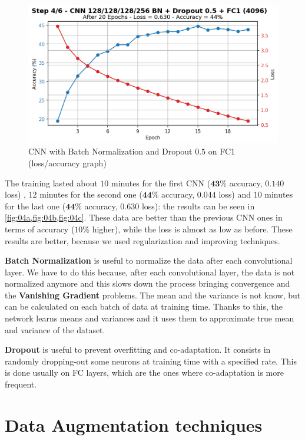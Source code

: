 \documentclass[a4paper, 11pt]{article}
\begin{document}
	\begin{figure}[ht!]
		\centering
		\includegraphics[width=0.62\paperwidth]{img/fig04c.png}
		\caption{CNN with Batch Normalization and Dropout $0.5$ on FC1 (loss/accuracy graph)}
		\label{fig:04c}
	\end{figure}
	\FloatBarrier
	\newpage
	The training lasted about $10$ minutes for the first CNN ($\boldsymbol{43\%}$ accuracy, $\boldsymbol{0.140}$ loss)  , $12$ minutes for the second one ($\boldsymbol{44\%}$ accuracy, $\boldsymbol{0.044}$ loss) and $10$ minutes for the last one ($\boldsymbol{44\%}$ accuracy, $\boldsymbol{0.630}$ loss): the results can be seen in \vref{fig:04a,fig:04b,fig:04c}.
	These data are better than the previous CNN ones in terms of accuracy ($10\%$ higher), while the loss is almost as low as before. 
	These results are better, because we used regularization and improving techniques.
	
	\textbf{Batch Normalization} is useful to normalize the data after each convolutional layer. We have to do this because, after each convolutional layer, the data is not normalized anymore and this slows down the process bringing convergence and the \textbf{Vanishing Gradient} problems. The mean and the variance is not know, but can be calculated on each batch of data at training time. Thanks to this, the network  learns means and variances and it uses them to approximate true mean and variance of the dataset.
	
	\textbf{Dropout} is useful to prevent overfitting and co-adaptation. It consists in randomly dropping-out some neurons at training time with a specified rate. This is done usually on FC layers, which are the ones where co-adaptation is more frequent. 
	
	\section{Data Augmentation techniques}
	
\end{document}
